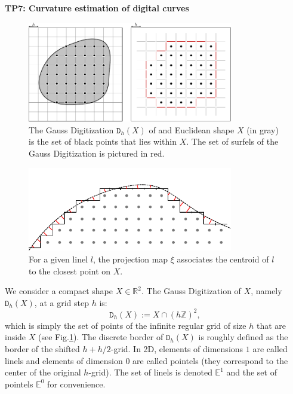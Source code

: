 \documentclass[a4paper, 11pt]{article}
\title{}
\author{}
\date{}
\begin{document}
\begin{center}
	\LARGE \textbf{TP7: Curvature estimation of digital curves}
\end{center}

\begin{figure}
  \centering
  \includegraphics[width=0.8\textwidth]{gauss}
  \caption{The Gauss Digitization $\mathtt{D}_h(X)$ of and Euclidean shape $X$ (in gray) is the set of black points that lies within $X$.
  The set of surfels of the Gauss Digitization is pictured in red. }
  \label{fig:gauss}
\end{figure}

\begin{figure}
  \centering
  \includegraphics[width=0.8\textwidth]{proj}
  \caption{For a given linel $l$, the projection map $\xi$ associates the centroid of $l$ to the closest point on $X$.}
  \label{fig:proj}
\end{figure}

We consider a compact shape $X \in \mathbb{R}^2$. The Gauss Digitization of $X$, namely $\mathtt{D}_h(X)$, at a grid step $h$ is:
\[
  \mathtt{D}_h(X) := X \cap (h\mathbb{Z})^{2},
\]
which is simply the set of points of the infinite regular grid of size $h$ that are inside $X$ (see Fig.\ref{fig:gauss}).
The discrete border of $\mathtt{D}_h(X)$ is roughly defined as the border of the shifted $h + h / 2$-grid. In 2D, elements of dimensions $1$ are called linels
and elements of dimension $0$ are called pointels (they correspond to the center of the original $h$-grid). The set of linels is denoted $\mathbb{E}^1$ and the set
of pointels $\mathbb{E}^0$ for convenience.
\end{document}
